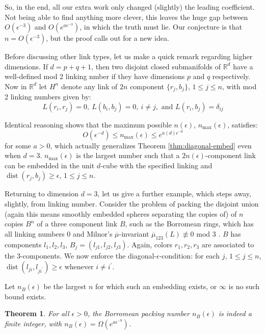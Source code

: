 \documentclass[12pt]{amsart}
\newcommand{\pr}{\prime}
\newcommand{\R}{\mathbb{R}}
\newcommand{\lbar}[1]{\overline{#1}}
\DeclareMathOperator{\dist}{dist}
\newtheorem{thm}{Theorem}
\theoremstyle{definition}
\theoremstyle{remark}
\begin{document}
So, in the end, all our extra work only changed (slightly) the leading coefficient. Not being able to find anything more clever, this leaves the huge gap between $O(\epsilon^{-3})$ and $O(e^{a\epsilon^{-3}})$, in which the truth must lie. Our conjecture is that $n = O(\epsilon^{-3})$, but the proof calls out for a new idea.

Before discussing other link types, let us make a quick remark regarding higher dimensions. If $d = p+q+1$, then two disjoint closed submanifolds of $\R^d$ have a well-defined mod 2 linking nmber if they have dimensions $p$ and $q$ respectively. Now in $\R^d$ let $H^n$ denote any link of $2n$ component $\{r_j, b_j\}$, $1 \leq j \leq n$, with mod 2 linking numbers given by:
\[
	L(r_i,r_j) = 0,\ L(b_i, b_j) = 0,\ i \neq j, \text{ and } L(r_i,b_j) = \delta_{ij}
\]

Identical reasoning shows that the maximum possible $n(\epsilon)$, $n_{\text{max}}(\epsilon)$, satisfies:
\begin{equation}
	O(\epsilon^{-d}) \leq n_{\text{max}}(\epsilon) \leq e^{a(d) \epsilon^{-d}}
\end{equation}
for some $a > 0$, which actually generalizes Theorem \ref{thm:diagonal-embed} even when $d = 3$. $n_{\text{max}}(\epsilon)$ is the largest number such that a $2n(\epsilon)$-component link can be embedded in the unit $d$-cube with the specified linking and $\dist(r_j,b_j) \geq \epsilon$, $1 \leq j \leq n$.

Returning to dimension $d=3$, let us give a further example, which steps away, slightly, from linking number. Consider the problem of packing the disjoint union (again this means smoothly embedded spheres separating the copies of) of $n$ copies $B^n$ of a three component link $B$, such as the Borromean rings, which has all linking numbers 0 and Milnor's $\lbar{\mu}$-invariant $\lbar{\mu}_{123}(L) \not\equiv 0$ mod 3 \cite{milnor54}. $B$ has components $l_1, l_2, l_3$, $B_j = (l_{j1},l_{j2},l_{j3})$. Again, colors $r_1,r_2,r_3$ are associated to the 3-components. We now enforce the diagonal-$\epsilon$-condition: for each $j$, $1 \leq j \leq n$, $\dist(l_{ji},l_{ji^\pr}) \geq \epsilon$ whenever $i \neq i^\pr$.

Let $n_B(\epsilon)$ be the largest $n$ for which such an embedding exists, or $\infty$ is no such bound exists.

\begin{thm}\label{thm:finite-int}
	For all $\epsilon > 0$, the Borromean packing number $n_B(\epsilon)$ is indeed a finite integer, with $n_B(\epsilon) = \Omega(e^{a\epsilon^{-9}})$.
\end{thm}
\end{document}
